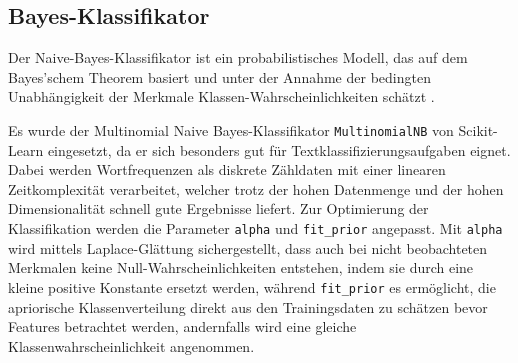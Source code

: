 \subsection{Bayes-Klassifikator}
\label{sec:bayes-klassifikator}

Der Naive-Bayes-Klassifikator ist ein probabilistisches Modell, das auf dem Bayes'schem Theorem basiert und unter der Annahme der bedingten Unabhängigkeit der Merkmale Klassen-Wahrscheinlichkeiten schätzt \cite{bishop_pattern_2006}.

Es wurde der Multinomial Naive Bayes-Klassifikator \texttt{MultinomialNB} von Scikit-Learn \cite{skicitLearnRef} eingesetzt, da er sich besonders gut für Textklassifizierungsaufgaben eignet. Dabei werden Wortfrequenzen als diskrete Zähldaten mit einer linearen Zeitkomplexität \cite{manning_introduction_2008} verarbeitet, welcher trotz der hohen Datenmenge und der hohen Dimensionalität schnell gute Ergebnisse liefert. Zur Optimierung der Klassifikation werden die Parameter \texttt{alpha} und \texttt{fit\_prior} angepasst. Mit \texttt{alpha} wird mittels Laplace-Glättung sichergestellt, dass auch bei nicht beobachteten Merkmalen keine Null-Wahrscheinlichkeiten entstehen, indem sie durch eine kleine positive Konstante ersetzt werden, während \texttt{fit\_prior} es ermöglicht, die apriorische Klassenverteilung direkt aus den Trainingsdaten zu schätzen bevor Features betrachtet werden, andernfalls wird eine gleiche Klassenwahrscheinlichkeit angenommen.
